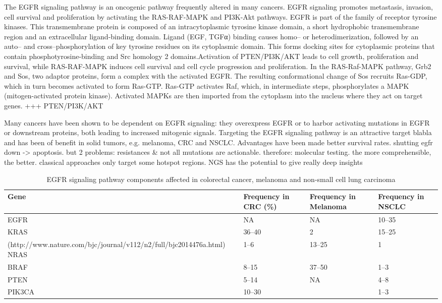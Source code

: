     The EGFR signaling pathway is an oncogenic pathway frequently altered in
    many cancers. EGFR signaling promotes metastasis, invasion, cell survival
    and proliferation by activating the RAS-RAF-MAPK and PI3K-Akt pathways. EGFR
    is part of the family of receptor tyrosine kinases. This transmembrane
    protein is composed of an intracytoplasmic tyrosine kinase domain, a short
    hydrophobic transmembrane region and an extracellular ligand-binding domain.
    Ligand (EGF, TGFα) binding causes homo-- or heterodimerization, followed by
    an auto-- and cross--phosphorylation of key tyrosine residues on its
    cytoplasmic domain. This forms docking sites for cytoplasmic proteins that
    contain phosphotyrosine-binding and Src homology 2 domains.Activation of
    PTEN/PI3K/AKT leads to cell growth, proliferation and survival, while
    RAS-RAF-MAPK induces cell survival and cell cycle progression and
    proliferation. In the RAS-Raf-MAPK pathway, Grb2 and Sos, two adaptor
    proteins, form a complex with the activated EGFR. The resulting
    conformational change of Sos recruits Ras-GDP, which in turn becomes
    activated to form Ras-GTP. Ras-GTP activates Raf, which, in intermediate
    steps, phosphorylates a MAPK (mitogen-activated protein kinase). Activated
    MAPKs are then imported from the cytoplasm into the nucleus where they act
    on target genes. +++ PTEN/PI3K/AKT

    Many cancers have been shown to be dependent on EGFR signaling: they
    overexpress EGFR or to harbor activating mutations in EGFR or downstream
    proteins, both leading to increased mitogenic signals. Targeting the EGFR
    signaling pathway is an attractive target blabla and has been of benefit in
    solid tumors, e.g. melanoma, CRC and NSCLC. Advantages have been made better
    survival rates. shutting egfr down -> apoptosis. but 2 problems: resistances &
    not all mutations are actionable. therefore: molecular testing. the more
    comprehensible, the better. classical approaches only target some hotspot
    regions. NGS has the potential to give really deep insights

    \begin{table}[!htbp]
        \caption[Occurrence of mutations]{EGFR signaling pathway components affected in colorectal cancer, melanoma and non-small cell lung carcinoma}
        \centering
        \begin{tabular}{ |p{4cm}|p{3.7cm}|p{6.3cm}|}
        \hline
        Gene & Frequency in CRC (\%) & Frequency in Melanoma & Frequency in NSCLC \\ \hline \hline
        EGFR & NA & NA & 10--35 \\
        KRAS & 36--40 & 2 & 15--25 \\ (http://www.nature.com/bjc/journal/v112/n2/full/bjc2014476a.html)
        NRAS & 1--6 & 13--25 & 1 \\
        BRAF & 8--15 & 37--50 & 1--3 \\
        PTEN & 5--14 & NA & 4--8 \\
        PIK3CA & 10--30 & & 1--3 \\
        \hline
      \end{tabular}
    \end{table}


